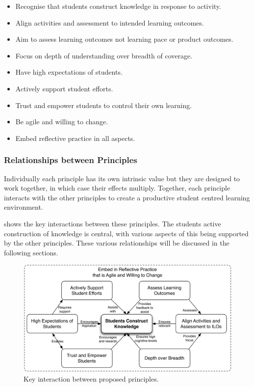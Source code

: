 \begin{itemize}
	\item Recognise that students construct knowledge in response to activity.
	\item Align activities and assessment to intended learning outcomes.
	\item Aim to assess learning outcomes not learning pace or product outcomes.
	\item Focus on depth of understanding over breadth of coverage.
	\item Have high expectations of students.
	\item Actively support student efforts.
	\item Trust and empower students to control their own learning.
	\item Be agile and willing to change.
	\item Embed reflective practice in all aspects.
\end{itemize}

\subsubsection{Relationships between Principles} %
\label{ssub:relationships_between_principles}

Individually each principle has its own intrinsic value but they are designed to work together, in which case their effects multiply. Together, each principle interacts with the other principles to create a productive student centred learning environment.

 shows the key interactions between these principles. The students active construction of knowledge is central, with various aspects of this being supported by the other principles. These various relationships will be discussed in the following sections.

\begin{figure}[htbp]
	\centering
	\includegraphics[width=\textwidth]{HowPrinciples}
	\caption{Key interaction between proposed principles.}
	\label{fig:how_principles}
\end{figure}

